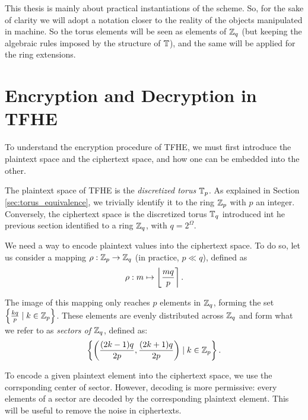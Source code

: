 This thesis is mainly about practical instantiations of the scheme. So, for the sake of clarity we will adopt a notation closer to the reality of the objects manipulated in machine. So the torus elements will be seen as elements of $\mathbb{Z}_q$ (but keeping the algebraic rules imposed by the structure of $\mathbb{T}$), and the same will be applied for the ring extensions. 



\section{Encryption and Decryption in TFHE}

To understand the encryption procedure of TFHE, we must first introduce the plaintext space and the ciphertext space, and how one can be embedded into the other.

The plaintext space of TFHE is the \textit{discretized torus} $\mathbb{T}_p$. As explained in Section \ref{sec:torus_equivalence}, we trivially identify it to the ring $\mathbb{Z}_p$ with $p$ an integer. Conversely, the ciphertext space is the discretized torus $\mathbb{T}_q$ introduced int he previous section identified to a ring $\mathbb{Z}_q$, with $q = 2^\Omega$. 


We need a way to encode plaintext values into the ciphertext space. To do so, let us consider a mapping $\rho: \mathbb{Z}_p \rightarrow \mathbb{Z}_q$ (in practice, $p \ll q$), defined as \[
\rho: m  \mapsto \left \lfloor \frac{m q} {p} \right \rceil.
\]


The image of this mapping only reaches $p$ elements in $\mathbb{Z}_q$, forming the set $\left \{ \frac {k q}{p} \mid k \in \mathbb{Z}_p \right \}$. These elements are evenly distributed across $\mathbb{Z}_q$ and form what we refer to as \emph{sectors of $\mathbb{Z}_q$}, defined as: \[
\left \{ \left ( \frac{(2 k - 1)q}{2p}, \frac{(2k + 1)q}{2p} \right ) \mid k \in \mathbb{Z}_p \right \}.
\]

To encode a given plaintext element into the ciphertext space, we use the corrsponding center of sector. However, decoding is more permissive: every elements of a sector are decoded by the corresponding plaintext element. This will be useful to remove the noise in ciphertexts.


